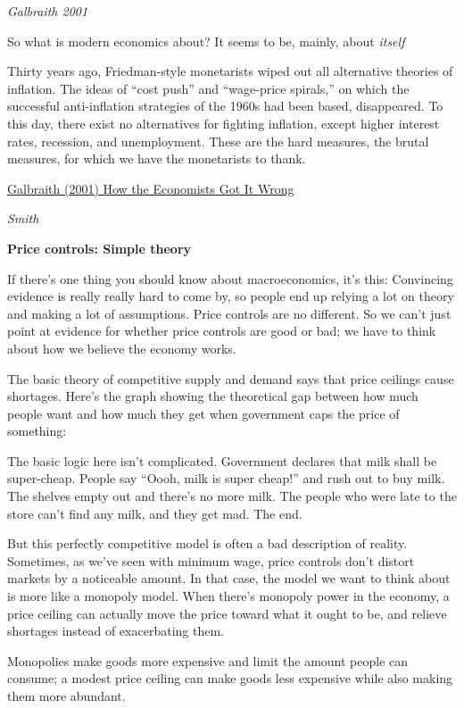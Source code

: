 \documentclass[
]{book}
\begin{document}
\emph{Galbraith 2001}

So what is modern economics about? It seems to be, mainly, about \emph{itself}

Thirty years ago, Friedman-style monetarists wiped out all alternative theories of inflation. The ideas of ``cost push'' and ``wage-price spirals,'' on which the successful anti-inflation strategies of the 1960s had been based, disappeared. To this day, there exist no alternatives for fighting inflation, except higher interest rates, recession, and unemployment. These are the hard measures, the brutal measures, for which we have the monetarists to thank.

\href{https://prospect.org/features/economists-got-wrong/}{Galbraith (2001) How the Economists Got It Wrong}

\emph{Smith}

\textbf{Price controls: Simple theory}

If there's one thing you should know about macroeconomics, it's this: Convincing evidence is really really hard to come by, so people end up relying a lot on theory and making a lot of assumptions. Price controls are no different. So we can't just point at evidence for whether price controls are good or bad; we have to think about how we believe the economy works.

The basic theory of competitive supply and demand says that price ceilings cause shortages. Here's the graph showing the theoretical gap between how much people want and how much they get when government caps the price of something:

The basic logic here isn't complicated. Government declares that milk shall be super-cheap. People say ``Oooh, milk is super cheap!'' and rush out to buy milk. The shelves empty out and there's no more milk. The people who were late to the store can't find any milk, and they get mad. The end.

But this perfectly competitive model is often a bad description of reality. Sometimes, as we've seen with minimum wage, price controls don't distort markets by a noticeable amount. In that case, the model we want to think about is more like a monopoly model. When there's monopoly power in the economy, a price ceiling can actually move the price toward what it ought to be, and relieve shortages instead of exacerbating them.

\href{fig/price_control_monopoly.png}{}

Monopolies make goods more expensive and limit the amount people can consume; a modest price ceiling can make goods less expensive while also making them more abundant.
\end{document}
